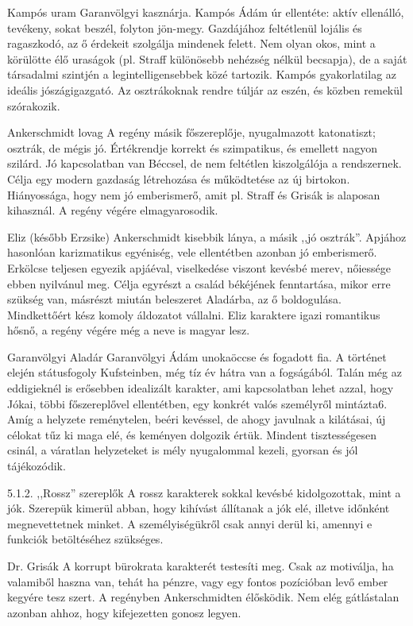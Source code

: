 \documentclass[a4paper,12pt]{thesis-ekf}
\begin{document}
    Kampós uram
    Garanvölgyi kasznárja. Kampós Ádám úr ellentéte: aktív ellenálló, tevékeny, sokat beszél, folyton jön-megy. Gazdájához feltétlenül lojális és ragaszkodó, az ő érdekeit szolgálja mindenek felett. Nem olyan okos, mint a körülötte élő uraságok (pl. Straff különösebb nehézség nélkül becsapja), de a saját társadalmi szintjén a legintelligensebbek közé tartozik. Kampós gyakorlatilag az ideális jószágigazgató. Az osztrákoknak rendre túljár az eszén, és közben remekül szórakozik.

    Ankerschmidt lovag
    A regény másik főszereplője, nyugalmazott katonatiszt; osztrák, de mégis jó. Értékrendje korrekt és szimpatikus, és emellett nagyon szilárd. Jó kapcsolatban van Béccsel, de nem feltétlen kiszolgálója a rendszernek. Célja egy modern gazdaság létrehozása és működtetése az új birtokon. Hiányossága, hogy nem jó emberismerő, amit pl. Straff és Grisák is alaposan kihasznál. A regény végére elmagyarosodik.

    Eliz (később Erzsike)
    Ankerschmidt kisebbik lánya, a másik ,,jó osztrák''. Apjához hasonlóan karizmatikus egyéniség, vele ellentétben azonban jó emberismerő. Erkölcse teljesen egyezik apjáéval, viselkedése viszont kevésbé merev, nőiessége ebben nyilvánul meg. Célja egyrészt a család békéjének fenntartása, mikor erre szükség van, másrészt miután beleszeret Aladárba, az ő boldogulása. Mindkettőért kész komoly áldozatot vállalni. Eliz karaktere igazi romantikus hősnő, a regény végére még a neve is magyar lesz.

    Garanvölgyi Aladár
    Garanvölgyi Ádám unokaöccse és fogadott fia. A történet elején státusfogoly Kufsteinben, még tíz év hátra van a fogságából. Talán még az eddigieknél is erősebben idealizált karakter, ami kapcsolatban lehet azzal, hogy Jókai, többi főszereplővel ellentétben, egy konkrét valós személyről mintázta6. Amíg a helyzete reménytelen, beéri kevéssel, de ahogy javulnak a kilátásai, új célokat tűz ki maga elé, és keményen dolgozik értük. Mindent tisztességesen csinál, a váratlan helyzeteket is mély nyugalommal kezeli, gyorsan és jól tájékozódik.

    5.1.2. ,,Rossz'' szereplők
    A rossz karakterek sokkal kevésbé kidolgozottak, mint a jók. Szerepük kimerül abban, hogy kihívást állítanak a jók elé, illetve időnként megnevettetnek minket. A személyiségükről csak annyi derül ki, amennyi e funkciók betöltéséhez szükséges.

    Dr. Grisák
    A korrupt bürokrata karakterét testesíti meg. Csak az motiválja, ha valamiből haszna van, tehát ha pénzre, vagy egy fontos pozícióban levő ember kegyére tesz szert. A regényben Ankerschmidten élősködik. Nem elég gátlástalan azonban ahhoz, hogy kifejezetten gonosz legyen.
\end{document}
